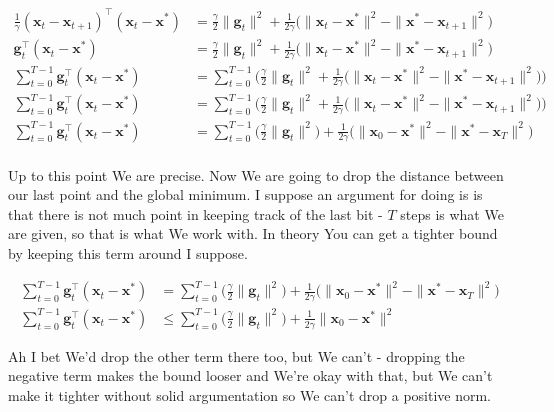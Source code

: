 \documentclass{article}
\begin{document}
	\begin{align*}
		\frac{1}{\gamma}(\mathbf{x}_t - \mathbf{x}_{t+1})^\top (\mathbf{x}_t - \mathbf{x}^*) &= \frac{\gamma}{2} \|\mathbf{g}_t\|^2 + \frac{1}{2\gamma}\big( \|\mathbf{x}_t - \mathbf{x}^*\|^2 - \| \mathbf{x}^* - \mathbf{x}_{t+1} \|^2 \big)\\
		\mathbf{g}_t^\top (\mathbf{x}_t - \mathbf{x}^*) &= \frac{\gamma}{2} \|\mathbf{g}_t\|^2 + \frac{1}{2\gamma}\big( \|\mathbf{x}_t - \mathbf{x}^*\|^2 - \| \mathbf{x}^* - \mathbf{x}_{t+1} \|^2 \big)\\
		\sum^{T-1}_{t=0} \mathbf{g}_t^\top (\mathbf{x}_t - \mathbf{x}^*) &= \sum^{T-1}_{t=0} \bigg(  \frac{\gamma}{2} \|\mathbf{g}_t\|^2 + \frac{1}{2\gamma}\big( \|\mathbf{x}_t - \mathbf{x}^*\|^2 - \| \mathbf{x}^* - \mathbf{x}_{t+1} \|^2 \big)\bigg)\\
		\sum^{T-1}_{t=0} \mathbf{g}_t^\top (\mathbf{x}_t - \mathbf{x}^*) &= \sum^{T-1}_{t=0} \bigg(  \frac{\gamma}{2} \|\mathbf{g}_t\|^2 + \frac{1}{2\gamma}\big( \|\mathbf{x}_t - \mathbf{x}^*\|^2 - \| \mathbf{x}^* - \mathbf{x}_{t+1} \|^2 \big)\bigg)\\
		\sum^{T-1}_{t=0} \mathbf{g}_t^\top (\mathbf{x}_t - \mathbf{x}^*) &= \sum^{T-1}_{t=0} \bigg(  \frac{\gamma}{2} \|\mathbf{g}_t\|^2\bigg) + \frac{1}{2\gamma}\big( \|\mathbf{x}_0 - \mathbf{x}^*\|^2 - \| \mathbf{x}^* - \mathbf{x}_{T} \|^2 \big)\\
	\end{align*}
	
	Up to this point We are precise. Now We are going to drop the distance between our last point and the global minimum. I suppose an argument for doing is is that there is not much point in keeping track of the last bit - $T$ steps is what We are given, so that is what We work with. In theory You can get a tighter bound by keeping this term around I suppose. 
	
	\begin{align*}
		\sum^{T-1}_{t=0} \mathbf{g}_t^\top (\mathbf{x}_t - \mathbf{x}^*) &= \sum^{T-1}_{t=0} \bigg(  \frac{\gamma}{2} \|\mathbf{g}_t\|^2\bigg) + \frac{1}{2\gamma}\big( \|\mathbf{x}_0 - \mathbf{x}^*\|^2 - \| \mathbf{x}^* - \mathbf{x}_{T} \|^2 \big)\\
		\sum^{T-1}_{t=0} \mathbf{g}_t^\top (\mathbf{x}_t - \mathbf{x}^*) &\le \sum^{T-1}_{t=0} \bigg(  \frac{\gamma}{2} \|\mathbf{g}_t\|^2\bigg) + \frac{1}{2\gamma} \|\mathbf{x}_0 - \mathbf{x}^*\|^2
	\end{align*}
	
	Ah I bet We'd drop the other term there too, but We can't - dropping the negative term makes  the bound looser and We're okay with that, but We can't make it tighter without solid argumentation so We can't drop a positive norm.
	
\end{document}
